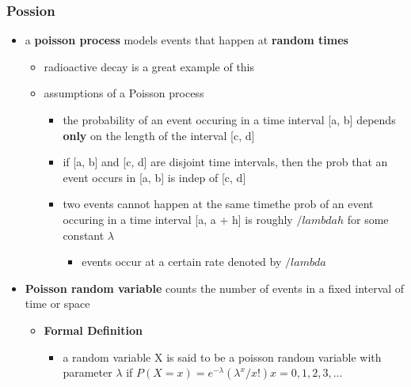 \documentclass[
]{article}
\providecommand{\tightlist}{%
  \setlength{\itemsep}{0pt}\setlength{\parskip}{0pt}}
\begin{document}
\hypertarget{possion}{%
\subsubsection{Possion}\label{possion}}

\begin{itemize}
\tightlist
\item
  a \textbf{poisson process} models events that happen at \textbf{random
  times}

  \begin{itemize}
  \tightlist
  \item
    radioactive decay is a great example of this
  \item
    assumptions of a Poisson process

    \begin{itemize}
    \tightlist
    \item
      the probability of an event occuring in a time interval {[}a, b{]}
      depends \textbf{only} on the length of the interval {[}c, d{]}
    \item
      if {[}a, b{]} and {[}c, d{]} are disjoint time intervals, then the
      prob that an event occurs in {[}a, b{]} is indep of {[}c, d{]}
    \item
      two events cannot happen at the same timethe prob of an event
      occuring in a time interval {[}a, a + h{]} is roughly
      \(/lambda h\) for some constant \(\lambda\)

      \begin{itemize}
      \tightlist
      \item
        events occur at a certain rate denoted by \textbf{\(/lambda\)}
      \end{itemize}
    \end{itemize}
  \end{itemize}
\item
  \textbf{Poisson random variable} counts the number of events in a
  fixed interval of time or space

  \begin{itemize}
  \tightlist
  \item
    \textbf{Formal Definition}

    \begin{itemize}
    \tightlist
    \item
      a random variable X is said to be a poisson random variable with
      parameter \(\lambda\) if
      \(P(X = x) = e^{-\lambda}(\lambda^{x}/x!) x = 0, 1, 2, 3, ...\)


\end{itemize}
\end{itemize}
\end{itemize}
\end{document}
